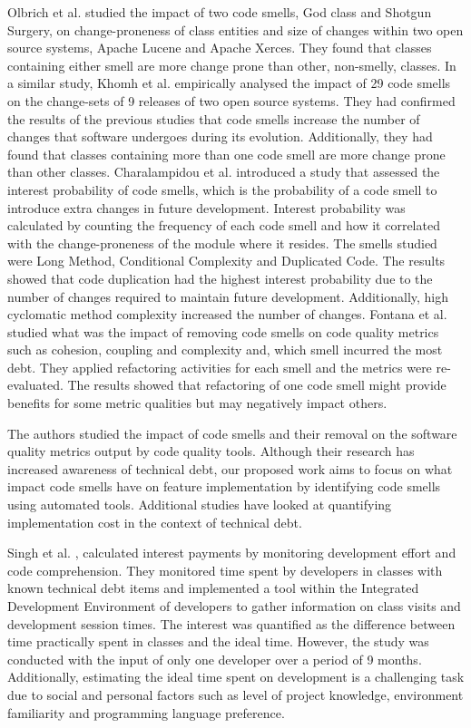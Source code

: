 Olbrich et al. \cite{Olbrich2009} studied the impact of two code smells, God
class and Shotgun Surgery, on change-proneness of class entities and size of
changes within two open source systems, Apache Lucene and Apache Xerces. They
found that classes containing either smell are more change prone than other,
non-smelly, classes. In a similar study, Khomh et al. \cite{Khomh2009}
empirically analysed the impact of 29 code smells on the change-sets of 9
releases of two open source systems. They had confirmed the results of the
previous studies that code smells increase the number of changes that software
undergoes during its evolution. Additionally, they had found that classes
containing more than one code smell are more change prone than other classes.
Charalampidou et al. \cite{Charalampidou2017} introduced a study that assessed
the interest probability of code smells, which is the probability of a code
smell to introduce extra changes in future development. Interest probability was
calculated by counting the frequency of each code smell and how it correlated
with the change-proneness of the module where it resides. The smells studied
were Long Method, Conditional Complexity and Duplicated Code. The results showed
that code duplication had the highest interest probability due to the number of
changes required to maintain future development. Additionally, high cyclomatic
method complexity increased the number of changes. Fontana et al.
\cite{Fontana2012} studied what was the impact of removing code smells on code
quality metrics such as cohesion, coupling and complexity and, which smell
incurred the most debt. They applied refactoring activities for each smell and
the metrics were re-evaluated. The results showed that refactoring of one code
smell might provide benefits for some metric qualities but may negatively impact
others.

The authors studied the impact of code smells and their removal on the software
quality metrics output by code quality tools. Although their research has
increased awareness of technical debt, our proposed work aims to focus on what
impact code smells have on feature implementation by identifying code smells
using automated tools. Additional studies have looked at quantifying
implementation cost in the context of technical debt.

Singh et al. \cite{Singh2014}, calculated interest payments by monitoring
development effort and code comprehension. They monitored time spent by
developers in classes with known technical debt items and implemented a tool
within the Integrated Development Environment of developers to gather
information on class visits and development session times. The interest was
quantified as the difference between time practically spent in classes and the
ideal time. However, the study was conducted with the input of only one
developer over a period of 9 months. Additionally, estimating the ideal time
spent on development is a challenging task due to social and personal factors
such as level of project knowledge, environment familiarity and programming
language preference.

